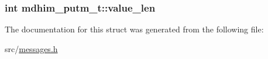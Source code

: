 \hypertarget{structmdhim__putm__t_af8cba256ae6e9003d55bc640c41f41e1}{
\subsubsection[{value\-\_\-len}]{\setlength{\rightskip}{0pt plus 5cm}int mdhim\-\_\-putm\-\_\-t\-::value\-\_\-len}}\label{d6/dcd/structmdhim__putm__t_af8cba256ae6e9003d55bc640c41f41e1}


The documentation for this struct was generated from the following file\-:\begin{DoxyCompactItemize}
\item 
src/\hyperlink{messages_8h}{messages.\-h}\end{DoxyCompactItemize}
